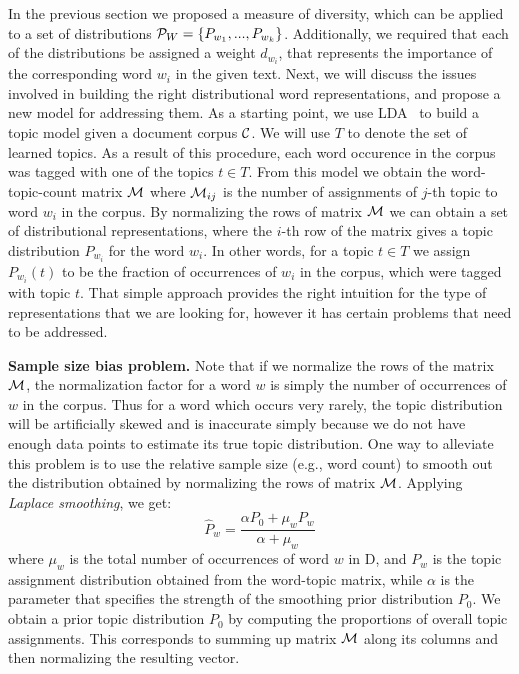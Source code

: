 In the previous section we proposed a measure of diversity, which can
be applied to a set of distributions
${\mathcal P}_{W}=\{P_{w_1},...,P_{w_k}\}$. Additionally, we required that 
each of the distributions be assigned a weight $d_{w_i}$, that
represents the importance of the corresponding word $w_i$ in the given
text. Next, we will discuss the issues involved in building the right
distributional word representations, and propose a new model for
addressing them. As a starting point, we use 
LDA~\cite{Blei:2003:LDA:944919.944937} to build a topic model given a
document corpus ${\mathcal C}$. We will use $T$ to denote
the set of learned topics. As a result of this procedure, each word
occurence in the corpus was tagged with one of the topics $t\in
T$. From this model we obtain the  
word-topic-count matrix ${\mathcal M}$ where ${\mathcal M}_{ij}$ is the number of
assignments of $j$-th topic to word $w_i$ in the corpus. By
normalizing the rows of matrix ${\mathcal M}$ we can obtain 
a set of distributional representations, where the $i$-th row of the
matrix gives a topic distribution $P_{w_i}$ for the word $w_i$. In
other words, for a topic $t\in T$ we assign $P_{w_i}(t)$ to be the
fraction of occurrences of $w_i$ in the corpus, which were tagged with
topic $t$. That simple approach provides the right intuition for the
type of representations that we are looking for, however it has
certain problems that need to be addressed.

{\bf Sample size bias problem.}  Note that 
if we normalize the rows of the matrix ${\mathcal M}$, the normalization factor   
for a word $w$ is simply the number of occurrences of $w$ in the
corpus. Thus for a word which occurs very rarely, the topic
distribution will be artificially skewed and is inaccurate simply
because we do not have 
enough data points to estimate its true topic distribution. 
One way to alleviate this problem is to use the relative sample size
(e.g., word count) to smooth out the distribution obtained by
normalizing the rows of matrix ${\mathcal M}$. 
Applying {\em Laplace smoothing}, we get:
\begin{equation}
\widehat{P}_w=\frac{\alpha P_0+ \mu_w P_w}{\alpha+\mu_w}
\end{equation}
where $\mu_w$ is the total number of occurrences of word $w$ in D, and $P_w$ is the
topic assignment distribution obtained from the word-topic matrix,
while $\alpha$ is the parameter that specifies the strength of the
smoothing prior distribution $P_0$. We obtain a prior 
 topic distribution $P_0$ by computing the proportions of overall topic
 assignments. This corresponds to summing up matrix ${\mathcal M}$ along its
 columns and then normalizing the resulting vector.

